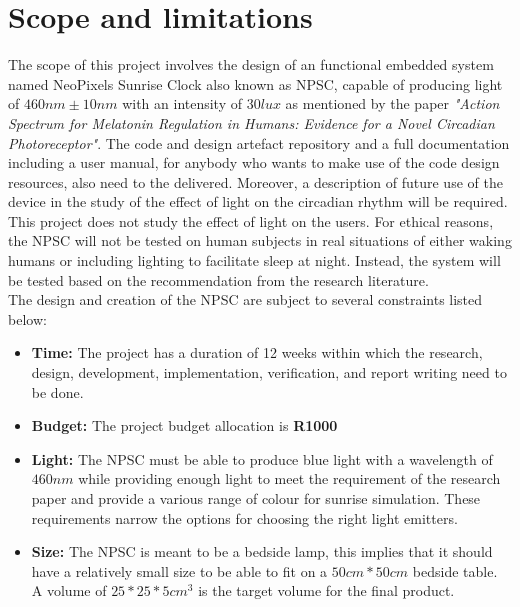 \section{Scope and limitations}\label{scope_and_limitations}

The scope of this project involves the design of an functional embedded system named NeoPixels Sunrise Clock also known as NPSC, capable of producing light of $460nm \pm 10nm$ with an intensity of $30 lux$ as mentioned by the paper \textit{"Action Spectrum for Melatonin Regulation in Humans: Evidence for a Novel Circadian Photoreceptor"}. The code and design artefact repository and a full documentation including a user manual, for anybody who wants to make use of the code design resources, also need to the delivered. Moreover, a description of future use of the device in the study of the effect of light on the circadian rhythm will be required.\\
This project does not study the effect of light on the users. For ethical reasons, the NPSC will not be tested on human subjects in real situations of either waking humans or including lighting to facilitate sleep at night. Instead, the system will be tested based on the recommendation from the research literature.\\
The design and creation of the NPSC are subject to several constraints listed below:
\begin{itemize}
\item \textbf{Time:} The project has a duration of 12 weeks within which the research, design, development, implementation, verification, and report writing need to be done.
\item \textbf{Budget:} The project budget allocation is \textbf{R1000}
\item \textbf{Light:} The NPSC must be able to produce blue light with a wavelength of  $460nm$ while providing enough light to meet the requirement of the research paper and provide a various range of colour for sunrise simulation. These requirements narrow the options for choosing the right light emitters.
\item \textbf{Size:} The NPSC is meant to be a bedside lamp, this implies that it should have a relatively small size to be able to fit on a $50cm*50cm$ bedside table. A volume of $25*25*5cm^3$ is the target volume for the final product.
\end{itemize}



